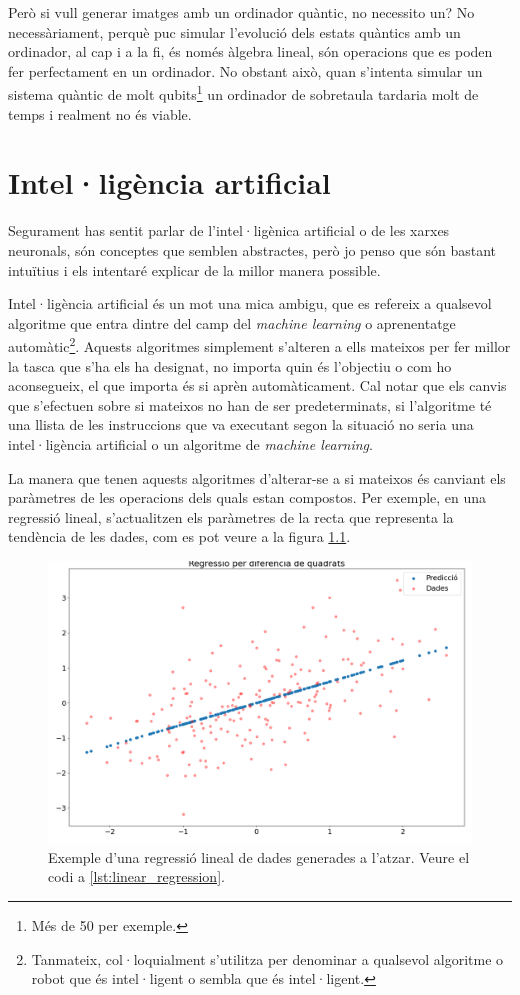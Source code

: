 Però si vull generar imatges amb un ordinador quàntic, no necessito un? No necessàriament, perquè puc simular l'evolució dels estats quàntics amb un ordinador, al cap i a la fi, és només àlgebra lineal, són operacions que es poden fer perfectament en un ordinador. No obstant això, quan s'intenta simular un sistema quàntic de molt qubits\footnote{Més de 50 per exemple.} un ordinador de sobretaula tardaria molt de temps i realment no és viable.


\chapter{Intel·ligència artificial}

Segurament has sentit parlar de l'intel·ligènica artificial o de les xarxes neuronals, són conceptes que semblen abstractes, però jo penso que són bastant intuïtius i els intentaré explicar de la millor manera possible.

Intel·ligència artificial és un mot una mica ambigu, que es refereix a qualsevol algoritme que entra dintre del camp del \textit{machine learning} o aprenentatge automàtic\footnote{Tanmateix, col·loquialment s'utilitza per denominar a qualsevol algoritme o robot que és intel·ligent o sembla que és intel·ligent. }. Aquests algoritmes simplement s'alteren a ells mateixos per fer millor la tasca que s'ha els ha designat, no importa quin és l'objectiu o com ho aconsegueix, el que importa és si aprèn automàticament. Cal notar que els canvis que s'efectuen sobre si mateixos no han de ser predeterminats, si l'algoritme té una llista de les instruccions que va executant segon la situació no seria una intel·ligència artificial o un algoritme de \textit{machine learning}.

La manera que tenen aquests algoritmes d'alterar-se a si mateixos és canviant els paràmetres de les operacions dels quals estan compostos. Per exemple, en una regressió lineal, s'actualitzen els paràmetres de la recta que representa la tendència de les dades, com es pot veure a la figura \ref{fig:leastsquares}.

\begin{figure}
	\centering
	\includegraphics[width=0.7\linewidth]{Figures/least_squares}
	\caption{Exemple d'una regressió lineal de dades generades a l'atzar. Veure el codi a \ref{lst:linear_regression}.}
	\label{fig:leastsquares}
\end{figure}

